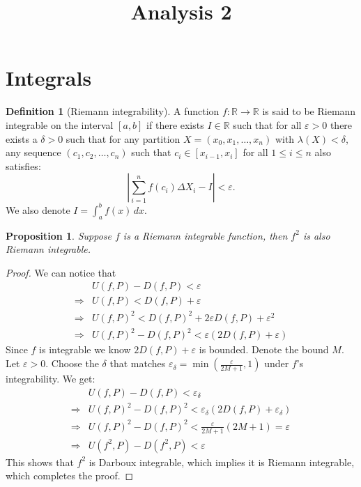 \documentclass[11pt,a4paper]{article}
\title{\textbf{Analysis 2}}
\author{}
\date{}
\theoremstyle{definition}
\newtheorem{definition}{Definition}[section]
\theoremstyle{plain}
\newtheorem{proposition}[theorem]{Proposition}
\newcommand{\R}{\mathbb{R}}
\newcommand{\abs}[1]{\left\lvert #1\right\rvert}
\begin{document}
	\maketitle
	\newpage
  \section{Integrals}
  \begin{definition}[Riemann integrability]
    A function $f \colon \R \to \R$ is said to be Riemann integrable on the 
    interval $[a,b]$ if there exists $I \in \R$ such that for all 
    $\varepsilon > 0$ there exists a $\delta > 0$ such that 
    for any partition $X = (x_0,x_1,\dots,x_n)$ with $\lambda(X) < \delta$, 
    any sequence $(c_1,c_2,\ldots,c_n)$ such that $c_i \in[x_{i-1},x_i]$ for
    all $1 \le i \le n$ also satisfies:
    \[
      \abs{\sum_{i=1}^{n}{f(c_i)\Delta X_i} - I} < \varepsilon.
	  \]
    We also denote $I = \int_{a}^{b} f(x)\,dx$.
  \end{definition}
  \begin{proposition}
	  Suppose $f$ is a Riemann integrable function,
    then $f^2$ is also Riemann integrable.
  \end{proposition}
  \begin{proof}
    We can notice that
    \begin{align*}
      &U(f,P) - D(f,P) < \varepsilon \\
      \Rightarrow &U(f,P) < D(f,P) + \varepsilon \\
      \Rightarrow &U(f,P)^2<D(f,P)^2 + 2\varepsilon D(f,P) + \varepsilon^2 \\
      \Rightarrow &U(f,P)^2 - D(f,P)^2 < \varepsilon (2D(f,P) + \varepsilon)
    \end{align*}	
    Since $f$ is integrable we know $2D(f,P) + \varepsilon$ is bounded.
    Denote the bound $M$.
    Let $\varepsilon > 0$.
    Choose the $\delta$ that matches 
    $\varepsilon_{\delta} = \min(\frac{\varepsilon}{2M+1},1)$ 
    under $f$'s integrability.
    We get:
      \begin{align*}
        &U(f,P) - D(f,P) < \varepsilon_{\delta} \\
        \Rightarrow &U(f,P)^2 - D(f,P)^2 <
          \varepsilon_{\delta} (2D(f,P) + \varepsilon_{\delta}) \\
        \Rightarrow &U(f,P)^2 - D(f,P)^2 <
          \frac{\varepsilon}{2M+1} (2M + 1) = \varepsilon \\
        \Rightarrow &U(f^2,P) - D(f^2,P) < \varepsilon
      \end{align*}	
    This shows that $f^2$ is Darboux integrable, which implies
    it is Riemann integrable, which completes the proof.
  \end{proof}
\end{document}

